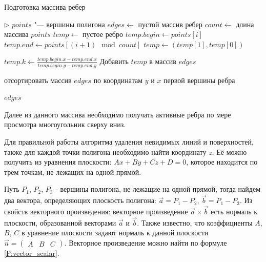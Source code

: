 \begin{breakablealgorithm}
    \caption{Подготовка массива ребер}\label{alg:A_MakeEdges}
    
    \begin{algorithmic}[1]
        \Statex $\triangleright$ $points$ "--- вершины полигона 
        \Statex
        \State $edges \leftarrow$ пустой массив ребер      
        \State $count \leftarrow $ длина массива $points$
        \State $temp \leftarrow$ пустое ребро
            \State $temp.begin \leftarrow points[i]$
            \State $temp.end \leftarrow points[(i+1)\mod count]$
                    \State $temp \leftarrow (temp[1], temp[0])$
                \EndIf
    
                \State $temp.k \leftarrow \frac{temp.begin.x - temp.end.x}{temp.begin.y - temp.end.y}$
                \State Добавить $temp$ в массив $edges$
            \EndIf
        \EndFor
        
        \State отсортировать массив $edges$ по координатам $y$ и $x$ первой вершины ребра
    
        \State \Return $edges$
    
    \EndFunction
    \end{algorithmic}
\end{breakablealgorithm}

Далее из данного массива необходимо получать активные ребра по мере просмотра многоугольник сверху вниз. 



Для правильной работы алгоритма удаления невидимых линий и поверхностей, также для каждой точки полигона необходимо найти координату $z$. Её можно получить из уравнения плоскости: $Ax + By + Cz + D = 0$, которое находится по трем точкам, не лежащих на одной прямой.

Путь $P_1$, $P_2$, $P_3$ - вершины полигона, не лежащие на одной прямой, тогда найдем два вектора, определяющих плоскость полигона: $\vec{a} = P_1 - P_2 $, $\vec{b} = P_1 - P_3 $. Из свойств векторного произведения: векторное произведение $\vec{a} \times \vec{b}$  есть нормаль к плоскости, образованной векторами $\vec{a}$ и $\vec{b}$. Также известно, что коэффициенты $A$, $B$, $C$  в уравнение плоскости задают нормаль к данной плоскости $ \vec{n} = \begin{pmatrix}
        A & B & C
    \end{pmatrix}$. Векторное произведение можно найти по формуле \eqref{F:vector_scalar}.

